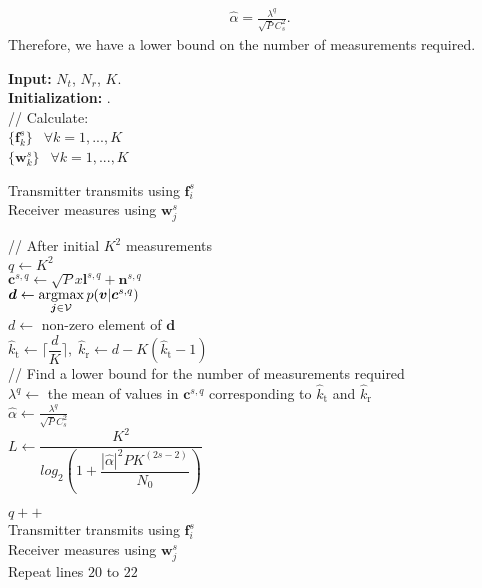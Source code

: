 \documentclass{ieeeaccess}
\newcommand{\argmax}{\operatornamewithlimits{argmax}}
\begin{document}
\begin{align}\label{n33}
\hat{\alpha} =  \frac{ \lambda^q}{\sqrt{P} C^2_{s} }.
\end{align}
Therefore, we have a lower bound on the number of measurements required.

\begin{algorithm}
\DontPrintSemicolon 
\textbf{Input:} $N_t$, $N_r$, $K$. \\

\textbf{Initialization:} .\\

// Calculate:\\
$ \{\boldsymbol{f}^s_k\} \  \   $    $\forall k= 1,...,K$\\
$ \{\boldsymbol{w}^s_k\} \  \   $    $\forall k= 1,...,K$

 {

 {
 {
Transmitter transmits using $\boldsymbol{f}^s_i $\\
Receiver measures using $\boldsymbol{w}^s_j$
}
}

// After initial $K^2$ measurements\\
$q\leftarrow K^2$\\
$\boldsymbol{c}^{s,q} \leftarrow \sqrt{P}x\boldsymbol{l}^{s,q}+\boldsymbol{n}^{s,q}$\\
$\boldsymbol{d}\leftarrow \argmax\limits_{\boldsymbol{j} \in {\mathcal{V}}}p(\boldsymbol{v}|\boldsymbol{c}^{s,q})$\\
$d\leftarrow$ non-zero element of $\boldsymbol{d}$\\
$\hat{k}_\textrm{t} \leftarrow \lceil \dfrac{d}{K} \rceil ,\; \hat{k}_\textrm{r} \leftarrow d - K(\hat{k}_\textrm{t} - 1)$\\



// Find a lower bound for the number of measurements required\\
$\lambda^q\leftarrow$ the mean of values in $\boldsymbol{c}^{s,q}$ corresponding to $\hat{k}_\textrm{t}$ and $\hat{k}_\textrm{r}$\\
$\hat{\alpha} \leftarrow  \frac{ \lambda^q}{\sqrt{P} C^2_{s} }$\\
$L\leftarrow\dfrac{K^2}{log_2(1 + \dfrac{|\hat{\alpha}|^2PK^{(2s-2)}}{N_0})}$




 {
 {
$q++$\\
Transmitter transmits using $\boldsymbol{f}^s_i $\\
Receiver measures using $\boldsymbol{w}^s_j$\\
Repeat lines $20$ to $22$\\
}
}

}
\end{algorithm}
\end{document}
